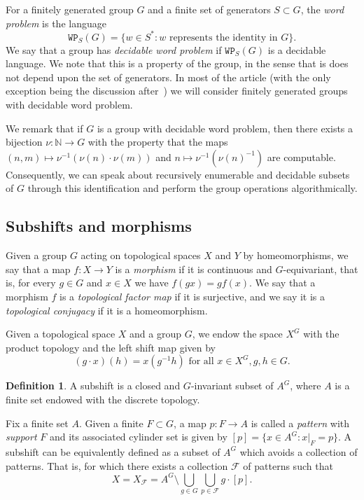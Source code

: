 \documentclass{article}
\theoremstyle{definition}
\newtheorem{definition}[theorem]{Definition}
\theoremstyle{plain}
\newcommand{\NN}{\mathbb{N}}
\newcommand{\FF}{\mathcal{F}}
\newcommand{\define}[1]{\textit{#1}}
\begin{document}
For a finitely generated group $G$ and a finite set of generators $S\subset G$, the \define{word problem} is the language \[ \texttt{WP}_S(G) = \{w \in S^* : w \mbox{ represents the identity in } G\}.    \]
We say that a group has \define{decidable word problem} if $\texttt{WP}_S(G)$ is a decidable language. We note that this is a property of the group, in the sense that is does not depend upon the set of generators. In most of the article (with the only exception being the discussion after~) we will consider finitely generated groups with decidable word problem.

We remark that if $G$ is a group with decidable word problem, then there exists a bijection $\nu \colon \NN \to G$ with the property that the maps $(n,m) \mapsto \nu^{-1}(\nu(n)\cdot \nu(m))$ and $n \mapsto \nu^{-1}(\nu(n)^{-1})$ are computable. Consequently, we can speak about recursively enumerable and decidable subsets of $G$ through this identification and perform the group operations algorithmically.

\subsection{Subshifts and morphisms}

Given a group $G$ acting on topological spaces $X$ and $Y$ by homeomorphisms, we say that a map $f\colon X \to Y$ is a \define{morphism} if it is continuous and $G$-equivariant, that is, for every $g \in G$ and $x \in X$ we have $f(gx)=gf(x)$. We say that a morphism $f$ is a \define{topological factor map} if it is surjective, and we say it is a \define{topological conjugacy} if it is a homeomorphism.

Given a topological space $X$ and a group $G$, we endow the space $X^G$ with the product topology and the left shift map given by \[ (g\cdot x)(h) = x(g^{-1}h) \mbox{ for all } x \in X^G, g,h \in G.  \]

\begin{definition}
    A subshift is a closed and $G$-invariant subset of $A^G$, where $A$ is a finite set endowed with the discrete topology.
\end{definition}

Fix a finite set $A$. Given a finite $F\subset G$, a map $p \colon F \to A$ is called a \define{pattern} with \define{support} $F$ and its associated cylinder set is given by $[p] = \{ x \in A^G : x|_F = p\}$. A subshift can be equivalently defined as a subset of $A^G$ which avoids a collection of patterns. That is, for which there exists a collection $\FF$ of patterns such that \[ X = X_{\FF} = A^G \setminus \bigcup_{g \in G}\bigcup_{p \in \FF}g\cdot [p].   \]
\end{document}
